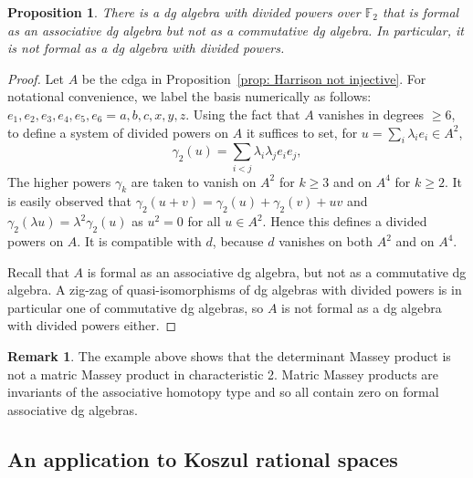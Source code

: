 \documentclass[11pt]{article}
\newtheorem{proposition}[theorem]{Proposition}
\theoremstyle{definition}
\theoremstyle{definition}
\newtheorem{remark}[theorem]{Remark}
\begin{document}
\begin{proposition}
\label{prop: dividedpowers}
There is a dg algebra with divided powers over $\mathbb F_2$ that is
formal as an associative dg algebra but not as a commutative dg
algebra. In particular, it is not formal as a dg algebra with divided
powers.
\end{proposition}

\begin{proof}
Let $A$ be the cdga in Proposition~\ref{prop: Harrison not injective}.
For notational convenience, we label the basis numerically as follows: $e_1,e_2,e_3,e_4,e_5,e_6=a,b,c,x,y,z$.
Using the fact that $A$ vanishes in degrees $\geq 6$, to define a system of divided powers on $A$ it suffices to set, for $u=\sum_i\lambda_ie_i\in A^2$, 
\begin{equation*}
\gamma_2(u)=\sum_{i<j}\lambda_i\lambda_je_ie_j,
\end{equation*}
The higher powers $\gamma_k$ are taken to vanish on $A^2$ for $k\geq 3$ and on $A^4$ for $k\geq 2$.
It is easily observed that $\gamma_2(u+v)=\gamma_2(u)+\gamma_2(v)+uv$ and $\gamma_2(\lambda u)=\lambda^2\gamma_2(u)$ as $u^2=0$ for all $u\in A^2$.
Hence this defines a divided powers on $A$.
It is compatible with $d$, because $d$ vanishes on both $A^2$ and on $A^4$.

Recall that $A$ is formal as an associative dg algebra, but not as a commutative dg algebra.
A zig-zag of quasi-isomorphisms of dg algebras with divided powers is in particular one of commutative dg algebras, so $A$ is not formal as a dg algebra with divided powers either.
\end{proof}

\begin{remark}
\label{rmk: associative formality}
The example above shows that the determinant Massey product is not a matric Massey product
in characteristic 2.
Matric Massey products are invariants of the associative homotopy type and so all contain zero on formal associative dg algebras.
\end{remark}
















\subsection{An application to Koszul rational spaces}
\label{sec: Berglund example}
\end{document}
